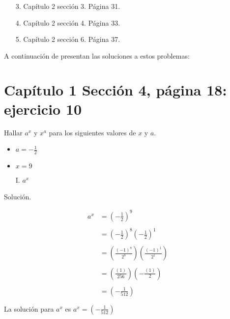 \documentclass[12pt]{article}
\begin{document}
\begin{enumerate}
    \item [3.] Capítulo 2 sección 3. Página 31.
    \item [4.] Capítulo 2 sección 4. Página 33.
    \item [5.] Capítulo 2 sección 6. Página 37.
\end{enumerate}

\sffamily
A continuación de presentan las soluciones a estos problemas:

\newpage

\section{Capítulo 1 Sección 4, página 18: ejercicio 10}

\sffamily
Hallar $a^x$ y $x^a$ para los siguientes valores de $x$ y $a$.

\begin{itemize}
    \item $a = -\frac{1}{2}$
    \item $x = 9$
\end{itemize}

\begin{enumerate}
    \item [I.] $a^x$
\end{enumerate}
{\red Solución.} 

\begin{equation}
    \begin{split}
        a^x & = {(- \frac{1}{2} )}^9\\\\
         & = {(-\frac{1}{2})}^8 {(-\frac{1}{2})}^1 \\\\
        & = (\frac{(-1)^8}{2^8}) (\frac{(-1)^1}{2^1}) \\\\
         & = (\frac{(1)}{256}) (-\frac{(1)}{2}) \\\\
          & = (-\frac{1}{512})\\\\
    \end{split}
\end{equation}
La solución para $a^x$ es $a^x = (-\frac{1}{512}) $ \\
\newpage
\end{document}
